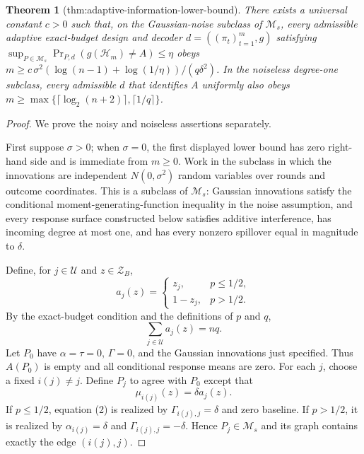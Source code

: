 \documentclass{article}
\newtheorem{theorem}{Theorem}
\begin{document}
\begin{theorem}[thm:adaptive-information-lower-bound]\label{thm:adaptive-information-lower-bound}
There exists a universal constant \(c>0\) such that, on the Gaussian-noise subclass of \(\mathcal M_s\), every admissible adaptive exact-budget design and decoder \(d=((\pi_t)_{t=1}^m,g)\) satisfying \(\sup_{P\in\mathcal M_s}\Pr_{P,d}(g(\mathscr H_m)\ne A)\le\eta\) obeys \(m\ge c\,\sigma^2(\log(n-1)+\log(1/\eta))/(q\delta^2)\). In the noiseless degree-one subclass, every admissible \(d\) that identifies \(A\) uniformly also obeys \(m\ge\max\{\lceil\log_2(n+2)\rceil,\lceil1/q\rceil\}\).
\end{theorem}
\begin{proof}
We prove the noisy and noiseless assertions separately.

First suppose \(\sigma>0\); when \(\sigma=0\), the first displayed lower bound has zero right-hand side and is immediate from \(m\ge0\).  Work in the subclass in which the innovations are independent \(N(0,\sigma^2)\) random variables over rounds and outcome coordinates.  This is a subclass of \(\mathcal M_s\): Gaussian innovations satisfy the conditional moment-generating-function inequality in the noise assumption, and every response surface constructed below satisfies additive interference, has incoming degree at most one, and has every nonzero spillover equal in magnitude to \(\delta\).

Define, for \(j\in\mathcal U\) and \(z\in\mathcal Z_B\),
\[
 a_j(z)=\begin{cases}z_j,&p\le1/2,\\1-z_j,&p>1/2.\end{cases}
\]
By the exact-budget condition and the definitions of \(p\) and \(q\),
\[
 \sum_{j\in\mathcal U}a_j(z)=nq. \tag{1}
\]
Let \(P_0\) have \(\alpha=\tau=0\), \(\Gamma=0\), and the Gaussian innovations just specified.  Thus \(A(P_0)\) is empty and all conditional response means are zero.  For each \(j\), choose a fixed \(i(j)\ne j\).  Define \(P_j\) to agree with \(P_0\) except that
\[
 \mu_{i(j)}(z)=\delta a_j(z). \tag{2}
\]
If \(p\le1/2\), equation (2) is realized by \(\Gamma_{i(j),j}=\delta\) and zero baseline.  If \(p>1/2\), it is realized by \(\alpha_{i(j)}=\delta\) and \(\Gamma_{i(j),j}=-\delta\).  Hence \(P_j\in\mathcal M_s\) and its graph contains exactly the edge \((i(j),j)\).


\end{proof}
\end{document}
